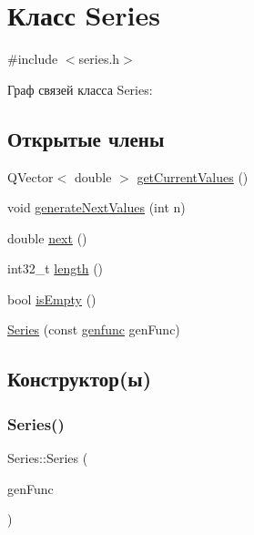 \hypertarget{class_series}{}\section{Класс Series}
\label{class_series}


{\ttfamily \#include $<$series.\+h$>$}



Граф связей класса Series\+:
\subsection*{Открытые члены}
\begin{DoxyCompactItemize}
\item 
Q\+Vector$<$ double $>$ \hyperlink{class_series_a2c20b127e35a3aac8207cecc270ead7e}{get\+Current\+Values} ()
\item 
void \hyperlink{class_series_a2274def40fd4c03eba80a8735b885dfb}{generate\+Next\+Values} (int n)
\item 
double \hyperlink{class_series_a0c87433f79b7d3359d986e130225d469}{next} ()
\item 
int32\+\_\+t \hyperlink{class_series_ab82d47cc93612b82c3621b89d7cbd511}{length} ()
\item 
bool \hyperlink{class_series_a1969cc0c07e2d0196e483f5e11f9d2db}{is\+Empty} ()
\item 
\hyperlink{class_series_a6cea206fab8fdad1f4dd64cb686e60a1}{Series} (const \hyperlink{series_8h_af9f3bd42d39ff918f5ad19b5d5df4dac}{genfunc} gen\+Func)
\end{DoxyCompactItemize}


\subsection{Конструктор(ы)}
\mbox{\label{class_series_a6cea206fab8fdad1f4dd64cb686e60a1}} 
\subsubsection{\texorpdfstring{Series()}{Series()}}
{\footnotesize\ttfamily Series\+::\+Series (\begin{DoxyParamCaption}\item[{const \hyperlink{series_8h_af9f3bd42d39ff918f5ad19b5d5df4dac}{genfunc}}]{gen\+Func }\end{DoxyParamCaption})}




